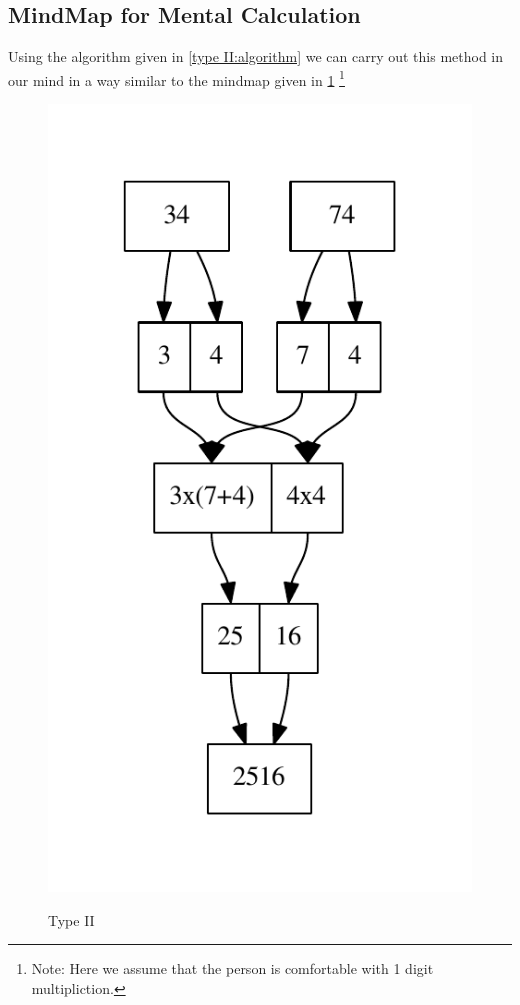 \documentclass{article}
\begin{document}
\subsection{MindMap for Mental Calculation}
Using the algorithm given in \ref{type II:algorithm} we can carry out this method in our mind in a way similar to the mindmap given in \ref{Figure2}
\footnote{Note: Here we assume that the person is comfortable with 1 digit multipliction.}
\newpage
\begin{figure}[h]
	\label{Figure2}
	\centering
	\includegraphics[scale=1]{g2.pdf} \\
	\caption{Type II}
\end{figure}
\newpage
\end{document}
